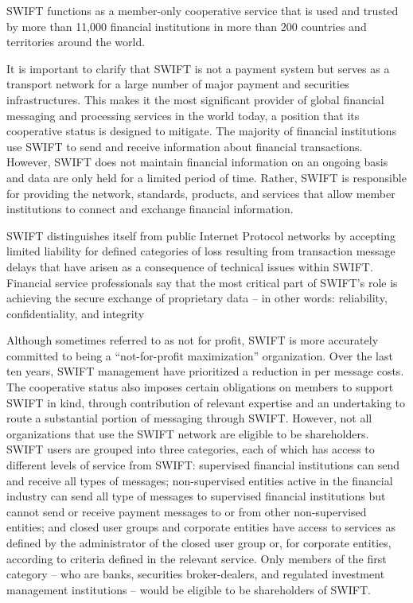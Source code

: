 \documentclass[12pt]{article}
\begin{document}
        SWIFT functions as a member-only cooperative service that is used and trusted by more than 11,000 financial institutions in more than 200 countries and territories around the world.
        
        It is important to clarify that SWIFT is not a payment system but serves as a transport network for a large number of major payment and securities infrastructures. This makes it the most significant provider of global financial messaging and processing services in the world today, a position that its cooperative status is designed to mitigate. The majority of financial institutions use SWIFT to send and receive information about financial transactions. However, SWIFT does not maintain financial information on an ongoing basis and data are only held for a limited period of time. Rather, SWIFT is responsible for providing the network, standards, products, and services that allow member institutions to connect and exchange financial information.
        
        SWIFT distinguishes itself from public Internet Protocol networks by accepting limited liability for defined categories of loss resulting from transaction message delays that have arisen as a consequence of technical issues within SWIFT. Financial service professionals say that the most critical part of SWIFT’s role is achieving the secure exchange of proprietary data – in other words: reliability, confidentiality, and integrity
        
        Although sometimes referred to as not for profit, SWIFT is more accurately committed to being a “not-for-profit maximization” organization. Over the last ten years, SWIFT management have prioritized a reduction in per message costs.
        The cooperative status also imposes certain obligations on members to support SWIFT in kind, through contribution of relevant expertise and an undertaking to route a substantial portion of messaging through SWIFT. However, not all organizations that use the SWIFT network are eligible to be shareholders. SWIFT users are grouped into three categories, each of which has access to different levels of service from SWIFT: supervised financial institutions can send and receive all types of messages; non-supervised entities active in the financial industry can send all type of messages to supervised financial institutions but cannot send or receive payment messages to or from other non-supervised entities; and closed user groups and corporate entities have access to services as defined by the administrator of the closed user group or, for corporate entities, according to criteria defined in the relevant service. Only members of the first category – who are banks, securities broker-dealers, and regulated investment management institutions – would be eligible to be shareholders of SWIFT. 
        
\end{document}
